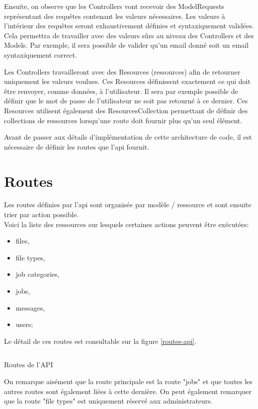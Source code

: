 \documentclass[
    iai, %
    il, %
]{heig-tb}
\begin{document}
Ensuite, on observe que les Controllers vont recevoir des ModelRequests représentant des requêtes
contenant les valeurs nécessaires. Les valeurs à l'intérieur des requêtes seront exhaustivement
définies et syntaxiquement validées. Cela permettra de travailler avec des valeurs sûrs au niveau
des Controllers et des Models. Par exemple, il sera possible de valider qu'un email donné soit un
email syntaxiquement correct.

Les Controllers travailleront avec des Resources (ressources) afin de retourner uniquement les
valeurs voulues. Ces Resources définissent exactement ce qui doit être renvoyer, comme données, à
l'utilisateur. Il sera par exemple possible de définir que le mot de passe de l'utilisateur ne soit
pas retourné à ce dernier. Ces Resources utilisent également des ResourcesCollection permettant de
définir des collections de ressources lorsqu'une route doit fournir plus qu'un seul élément.


Avant de passer aux détails d'implémentation de cette architecture de code, il est nécessaire de définir les routes que l'\Gls{api} fournit.

\section{Routes}
Les routes définies par l'\Gls{api} sont organisée par modèle / ressource et sont ensuite trier par action possible. \\
Voici la liste des ressources sur lesquels certaines actions peuvent être exécutées:
\begin{itemize}
    \item files,
    \item file types,
    \item job categories,
    \item jobs,
    \item messages,
    \item users;
\end{itemize}

Le détail de ces routes est consultable sur la figure \ref{routes-api}.
\begin{listing}[h]
    \inputminted{php}{assets/code/api.php}
    \caption{Routes de l'API \label{routes-api}}
\end{listing}

On remarque aisément que la route principale est la route "jobs" et que toutes les autres routes sont également liées à cette dernière. On peut également remarquer que la route "file types" est uniquement réservé aux administrateurs.
\end{document}
